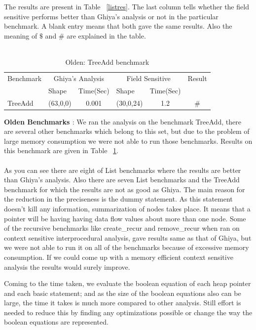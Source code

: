 The results are present in Table ~\ref{listres}. The last column tells whether the field sensitive performs better than Ghiya's analysis or not in the particular benchmark.
A blank entry means that both gave the same results. Also the meaning of $\$$ and $\#$ are explained in the table. \\ \\ 
\begin{table}[h]
\centering
\begin{tabular}{|l|l|c|l|c|c|}
\hline
\multicolumn{ 1}{|c|}{Benchmark} & \multicolumn{ 2}{c|}{Ghiya's Analysis} & \multicolumn{ 2}{c|}{Field Sensitive} & \multicolumn{ 1}{l|}{Result} \\ \cline{ 2- 5}
\multicolumn{ 1}{|c|}{} & Shape & \multicolumn{1}{l|}{Time(Sec)} & Shape & \multicolumn{1}{l|}{Time(Sec)} & \multicolumn{ 1}{l|}{} \\ \hline
TreeAdd & (63,0,0) & 0.001 & (30,0,24) & 1.2 & \# \\ \hline
\end{tabular}
\caption{Olden: TreeAdd benchmark}
\label{OldenRes}
\end{table}
\textbf{Olden Benchmarks \cite{Olden}}: We ran the analysis on the benchmark TreeAdd, there are several other benchmarks which belong to this set, but due to the problem of
large memory consumption we were not able to run those benchmarks. Results on this benchmark are given in Table ~\ref{OldenRes}.\\ \\
As you can see there are eight of List benchmarks where the results are better than Ghiya's analysis. Also there are seven List benchmarks and the TreeAdd benchmark for which the results are not as good as Ghiya.
The main reason for the reduction in the preciseness is the dummy statement. As this statement doesn't kill any information, summarization of nodes takes
place. It means that a pointer will be having having data flow values about more than one node. Some of the recursive benchmarks like create\_recur and remove\_recur 
when ran on context sensitive interprocedural analysis, gave results same as that of Ghiya, but we were not able to run it on all of the benchmarks because of excessive memory consumption. 
If we could come up with a memory efficient context sensitive analysis the results would surely improve.

Coming to the time taken, we evaluate the boolean equation of each heap pointer and each basic statement; and as the size of the boolean equations also
can be large, the time it takes is much more compared to other analysis. Still effort is needed to reduce this by finding any optimizations possible or change the
way the boolean equations are represented. 

